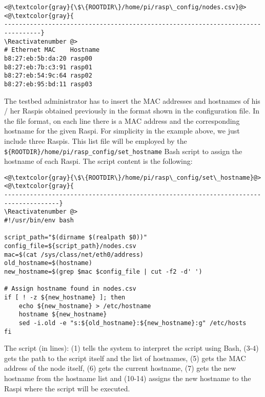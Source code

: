 \Suppressnumber\begin{lstlisting}[]
<@\textcolor{gray}{\$\{ROOTDIR\}/home/pi/rasp\_config/nodes.csv}@>
<@\textcolor{gray}{
--------------------------------------------------------------------------------}
\Reactivatenumber @>
# Ethernet MAC    Hostname
b8:27:eb:5b:da:20 rasp00
b8:27:eb:7b:c3:91 rasp01
b8:27:eb:54:9c:64 rasp02
b8:27:eb:95:bd:11 rasp03
\end{lstlisting}
\FloatBarrier
\vspace{-5mm}

The testbed administrator has to insert the \ac{MAC} addresses and hostnames
of his / her \ac{Raspi}s obtained previously in the format shown in the
configuration file. In the file format, on each line there is a \ac{MAC}
address and the corresponding hostname for the given \ac{Raspi}. For
simplicity in the example above, we just include three \ac{Raspi}s.
This list file will be employed by the
\texttt{\$\{ROOTDIR\}/home/pi/rasp\_config/set\_hostname}
\ac{Bash} script to assign the hostname of each \ac{Raspi}.
The script content is the following:

\Suppressnumber\begin{lstlisting}[]
<@\textcolor{gray}{\$\{ROOTDIR\}/home/pi/rasp\_config/set\_hostname}@>
<@\textcolor{gray}{
-------------------------------------------------------------------------------------}
\Reactivatenumber @>
#!/usr/bin/env bash

script_path="$(dirname $(realpath $0))"
config_file=${script_path}/nodes.csv
mac=$(cat /sys/class/net/eth0/address)
old_hostname=$(hostname)
new_hostname=$(grep $mac $config_file | cut -f2 -d' ')

# Assign hostname found in nodes.csv
if [ ! -z ${new_hostname} ]; then
    echo ${new_hostname} > /etc/hostname
    hostname ${new_hostname}
    sed -i.old -e "s:${old_hostname}:${new_hostname}:g" /etc/hosts
fi
\end{lstlisting}
\FloatBarrier
\vspace{-5mm}

The script (in lines): (1) tells the system to interpret the script
using \ac{Bash}, (3-4) gets the path to the script itself and the list of
hostnames, (5) gets the \ac{MAC} address of the node itself, (6) gets the
current hostname, (7) gets the new hostname from the hostname list and
(10-14) assigns the new hostname to the \ac{Raspi} where the script
will be executed.

